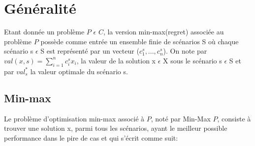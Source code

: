 \documentclass[a4paper, 12pt]{report}
\begin{document}
\section{Généralité}
	Etant donnée un problème $P$ $\epsilon$ $C$, la version min-max(regret) associée au problème $P$ possède comme entrée un ensemble finie de scénarios S où chaque scénario s $\epsilon$ S est représenté par un vecteur ($c_{1}^s,...,c_{n}^s$). On note par $val(x,s)=\sum_{i=1}^n c_{i}^s x_{i}$, la valeur de la solution x $\epsilon$ X sous le scénario s $\epsilon$ S et par $val_{s}^*$ la valeur optimale du scénario s.
	
\subsection{Min-max}
	Le problème d'optimisation min-max associé à $P$, noté par Min-Max $P$, consiste à trouver une solution x,  parmi tous les scénarios, ayant le meilleur possible performance dans le pire de cas et qui s'écrit comme suit:
\end{document}
